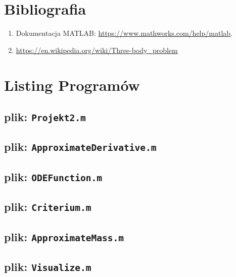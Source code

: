 \documentclass[a4paper, 12pt, twoside, openany]{article}
\begin{document}
	
	\newpage
	
	\section*{Bibliografia}
	\begin{enumerate}
		\item Dokumentacja MATLAB: \url{https://www.mathworks.com/help/matlab}.
		\item \url{https://en.wikipedia.org/wiki/Three-body\_problem}
	\end{enumerate}
	
	\newpage
	
	\section*{Listing Programów}
	
	\subsection*{plik: \texttt{Projekt2.m}}\vspace{-0.5em}
	
	\subsection*{plik: \texttt{ApproximateDerivative.m}}\vspace{-0.5em}
	
	\subsection*{plik: \texttt{ODEFunction.m}}\vspace{-0.5em}
	
	\subsection*{plik: \texttt{Criterium.m}}\vspace{-0.5em}
	
	\subsection*{plik: \texttt{ApproximateMass.m}}\vspace{-0.5em}
	
	\subsection*{plik: \texttt{Visualize.m}}\vspace{-0.5em}
	
\end{document}
